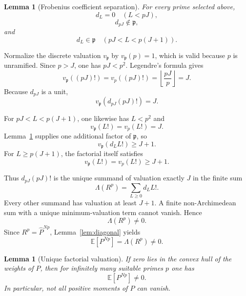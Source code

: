 \documentclass[11pt]{article}
\newtheorem{lemma}[theorem]{Lemma}
\theoremstyle{remark}
\newcommand{\E}{\mathbb E}
\begin{document}
\begin{lemma}[Frobenius coefficient separation]\label{lem:frob}
For every prime selected above,
\[
d_L=0\quad(L<pJ),
\]
\[
d_{pJ}\notin\mathfrak p,
\]
and
\[
d_L\in\mathfrak p\quad(pJ<L<p(J+1)).
\]
\end{lemma}

Normalize the discrete valuation $v_{\mathfrak p}$ by $v_{\mathfrak p}(p)=1$, which is valid because $p$ is unramified. Since $p>J$, one has $pJ<p^2$. Legendre's formula gives
\begin{equation}\label{eq:targetfac}
v_{\mathfrak p}((pJ)!)
=
v_p((pJ)!)
=
\left\lfloor\frac{pJ}{p}\right\rfloor
=
J.
\end{equation}
Because $d_{pJ}$ is a unit,
\begin{equation}\label{eq:targetval}
v_{\mathfrak p}\!\left(d_{pJ}(pJ)!\right)=J.
\end{equation}

For $pJ<L<p(J+1)$, one likewise has $L<p^2$ and
\[
v_{\mathfrak p}(L!)=v_p(L!)=J.
\]
Lemma~\ref{lem:frob} supplies one additional factor of $\mathfrak p$, so
\begin{equation}\label{eq:midval}
v_{\mathfrak p}(d_LL!)\ge J+1.
\end{equation}
For $L\ge p(J+1)$, the factorial itself satisfies
\begin{equation}\label{eq:highval}
v_{\mathfrak p}(L!)=v_p(L!)\ge J+1.
\end{equation}

Thus $d_{pJ}(pJ)!$ is the unique summand of valuation exactly $J$ in the finite sum
\begin{equation}\label{eq:lambdasum}
\Lambda(R^p)=\sum_{L\ge0}d_LL!.
\end{equation}
Every other summand has valuation at least $J+1$. A finite non-Archimedean sum with a unique minimum-valuation term cannot vanish. Hence
\[
\Lambda(R^p)\ne0.
\]
Since $R^p=\widehat P^{Np}$, Lemma~\ref{lem:diagonal} yields
\begin{equation}\label{eq:nonzero-moment}
\E[P^{Np}]=\Lambda(R^p)\ne0.
\end{equation}

\begin{lemma}[Unique factorial valuation]\label{lem:valuation}
If zero lies in the convex hull of the weights of $P$, then for infinitely many suitable primes $p$ one has
\[
\E[P^{Np}]\ne0.
\]
In particular, not all positive moments of $P$ can vanish.
\end{lemma}
\end{document}
